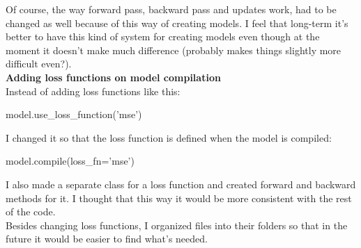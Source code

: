 \documentclass{article}
\begin{document}
Of course, the way forward pass, backward pass and updates work, had to be changed as well because of this 
way of creating models. I feel that long-term it's better to have this kind of system for creating models even 
though at the moment it doesn't make much difference (probably makes things slightly more difficult even?). \\

\textbf{Adding loss functions on model compilation} \\

Instead of adding loss functions like this:
\begin{python}
    model.use_loss_function('mse')
\end{python}

I changed it so that the loss function is defined when the model is compiled:
\begin{python}
    model.compile(loss_fn='mse')
\end{python}

I also made a separate class for a loss function and created forward and backward methods for it. I thought 
that this way it would be more consistent with the rest of the code. \\

Besides changing loss functions, I organized files into their folders so that in the future it would be easier
to find what's needed.
\end{document}
